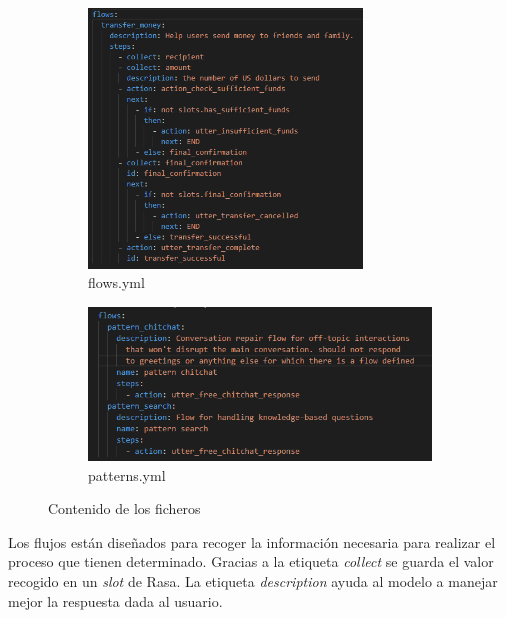 \documentclass[a4paper,11pt]{article}
\begin{document}
			\begin{figure}[H]
				\centering
				\begin{subfigure}{0.45\textwidth}
					\centering
					\includegraphics[width=0.8\textwidth]{img/02-flows.png}
					\caption{flows.yml}
				\end{subfigure}		
				\hspace{0cm}		
				\begin{subfigure}{0.45\textwidth}
					\centering
					\includegraphics[width=1\textwidth]{img/03-patterns.png}
					\caption{patterns.yml}
				\end{subfigure}
				\caption{Contenido de los ficheros}
				\label{fig:02-contenidoFicheros}
			\end{figure}
			
			Los flujos están diseñados para recoger la información necesaria para realizar el proceso que tienen determinado. Gracias a la etiqueta \textit{collect} se guarda el valor recogido en un \textit{slot} de Rasa. La etiqueta \textit{description} ayuda al modelo a manejar mejor la respuesta dada al usuario.
			
\end{document}
